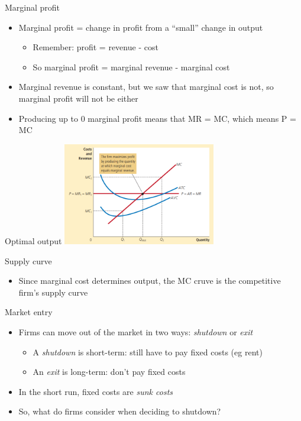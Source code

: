 \documentclass[aspectratio=169]{beamer}
\begin{document}
\begin{frame}{Marginal profit}
    \begin{itemize}
        \item Marginal profit = change in profit from a ``small'' change in output
            \begin{itemize}
                \item Remember: profit = revenue - cost
                \item So marginal profit = marginal revenue - marginal cost
            \end{itemize}
        \item Marginal revenue is constant, but we saw that marginal cost is not, so marginal profit will not be either
        \item Producing up to 0 marginal profit means that MR = MC, which means P = MC
    \end{itemize}
\end{frame}

\begin{frame}{Optimal output}
    \centering
    \includegraphics[width = 0.5\textwidth,keepaspectratio]{MReMC.png}
\end{frame}

\begin{frame}{Supply curve}
    \begin{itemize}
        \item Since marginal cost determines output, the MC cruve is the competitive firm's supply curve
    \end{itemize}
\end{frame}

\begin{frame}{Market entry}
    \begin{itemize}
        \item Firms can move out of the market in two ways: \textit{shutdown} or \textit{exit}
            \begin{itemize}
                \item A \textit{shutdown} is short-term: still have to pay fixed costs (eg rent)
                \item An \textit{exit} is long-term: don't pay fixed costs
            \end{itemize}
        \item In the short run, fixed costs are \textit{sunk costs}
        \item So, what do firms consider when deciding to shutdown?
    \end{itemize}
\end{frame}
\end{document}
